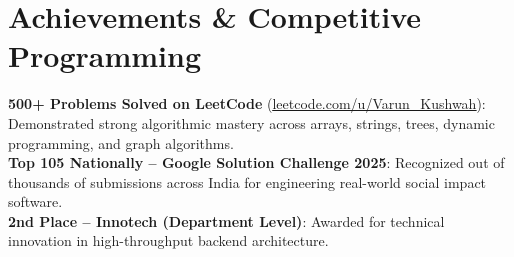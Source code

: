 \documentclass[letterpaper,10pt]{article}
\begin{document}
\section{Achievements \& Competitive Programming}
 \begin{itemize}[leftmargin=12pt]
    \small{\item{
     \textbf{500+ Problems Solved on LeetCode} (\href{https://leetcode.com/u/Varun_Kushwah/}{\underline{leetcode.com/u/Varun\_Kushwah}}){: Demonstrated strong algorithmic mastery across arrays, strings, trees, dynamic programming, and graph algorithms.} \\
     \textbf{Top 105 Nationally -- Google Solution Challenge 2025}{: Recognized out of thousands of submissions across India for engineering real-world social impact software.} \\
     \textbf{2nd Place -- Innotech (Department Level)}{: Awarded for technical innovation in high-throughput backend architecture.}
    }}
 \end{itemize}

\end{document}
